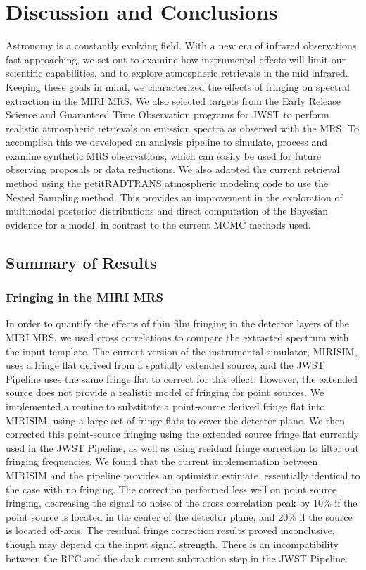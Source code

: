 \chapter{Discussion and Conclusions}
Astronomy is a constantly evolving field. 
With a new era of  infrared observations fast approaching, we set out to examine how instrumental effects will limit our scientific capabilities, and to explore atmospheric retrievals in the mid infrared.
Keeping these goals in mind, we characterized the effects of fringing on spectral extraction in the MIRI MRS.
We also selected targets from the Early Release Science and Guaranteed Time Observation programs for JWST to perform realistic atmospheric retrievals on emission spectra as observed with the MRS.
To accomplish this we developed an analysis pipeline to simulate, process and examine synthetic MRS observations, which can easily be used for future observing proposals or data reductions.
We also adapted the current retrieval method using the petitRADTRANS atmospheric modeling code to use the Nested Sampling method. 
This provides an improvement in the exploration of multimodal posterior distributions and direct computation of the Bayesian evidence for a model, in contrast to the current MCMC methods used.

\section{Summary of Results}
\subsection{Fringing in the MIRI MRS}
In order to quantify the effects of thin film fringing in the detector layers of the MIRI MRS, we used cross correlations to compare the extracted spectrum with the input template.
The current version of the instrumental simulator, MIRISIM, uses a fringe flat derived from a spatially extended source, and the JWST Pipeline uses the same fringe flat to correct for this effect.
However, the extended source does not provide a realistic model of fringing for point sources. 
We implemented a routine to substitute a point-source derived fringe flat into MIRISIM, using a large set of fringe flats to cover the detector plane.
We then corrected this point-source fringing using the extended source fringe flat currently used in the JWST Pipeline, as well as using residual fringe correction to filter out fringing frequencies.
We found that the current implementation between MIRISIM and the pipeline provides an optimistic estimate, essentially identical to the case with no fringing.
The correction performed less well on point source fringing, decreasing the signal to noise of the cross correlation peak by 10\% if the point source is located in the center of the detector plane, and 20\% if the source is located off-axis.
The residual fringe correction results proved inconclusive, though may depend on the input signal strength.
There is an incompatibility between the RFC and the dark current subtraction step in the JWST Pipeline. 

